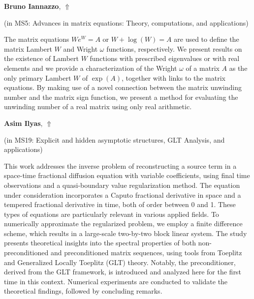 \documentclass[ILAS2025-program.tex]{subfiles}
\begin{document}
\hypertarget{down0065}{}\begin{ilasabstract}
    
\textbf{Bruno Iannazzo},  \hfill \hyperlink{up0065}{$\Uparrow$}
    
    
(in {\color{mstitle}MS5: Advances in matrix equations: Theory, computations, and applications})
        
\mtskip
    The matrix equations $We^W=A$ or $W+\log(W)=A$ are used to define the matrix Lambert $W$ and Wright $\omega$ functions, respectively. We present results on the existence of Lambert $W$ functions with prescribed eigenvalues or with real elements and we provide a characterization of the Wright $\omega$ of a matrix $A$ as the only primary Lambert $W$ of $\exp(A)$, together with links to the matrix equations. By making use of a novel connection between the matrix unwinding number and the matrix sign function, we present a method for evaluating the unwinding number of a real matrix using only real arithmetic.

\end{ilasabstract}
    

\hypertarget{down0176}{}\begin{ilasabstract}
    
\textbf{Asim Ilyas},  \hfill \hyperlink{up0176}{$\Uparrow$}
    
    
(in {\color{mstitle}MS19: Explicit and hidden asymptotic structures, GLT Analysis, and applications})
        
\mtskip
    This work addresses the inverse problem of reconstructing a source term in a space-time fractional diffusion equation with variable coefficients, using final time observations and a quasi-boundary value regularization method. The equation under consideration incorporates a Caputo fractional derivative in space and a tempered fractional derivative in time, both of order between 0 and 1. These types of equations are particularly relevant in various applied fields. To numerically approximate the regularized problem, we employ a finite difference scheme, which results in a large-scale two-by-two block linear system. The study presents theoretical insights into the spectral properties of both non-preconditioned and preconditioned matrix sequences, using tools from Toeplitz and Generalized Locally Toeplitz (GLT) theory. Notably, the preconditioner, derived from the GLT framework, is introduced and analyzed here for the first time in this context. Numerical experiments are conducted to validate the theoretical findings, followed by concluding remarks.
\end{ilasabstract}
    
\end{document}
